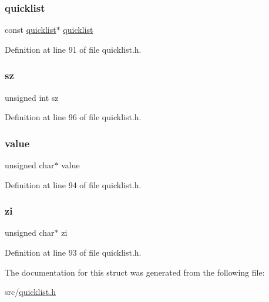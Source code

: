 \mbox{\label{structquicklist_entry_a4aa33c2ba0681808fcf026725cfac512}} 
\subsubsection{\texorpdfstring{quicklist}{quicklist}}
{\footnotesize\ttfamily const \hyperlink{structquicklist}{quicklist}$\ast$ \hyperlink{structquicklist}{quicklist}}



Definition at line 91 of file quicklist.\+h.

\mbox{\label{structquicklist_entry_a2c1bd10d4bbc82d2d6c052c5842c0c8c}} 
\subsubsection{\texorpdfstring{sz}{sz}}
{\footnotesize\ttfamily unsigned int sz}



Definition at line 96 of file quicklist.\+h.

\mbox{\label{structquicklist_entry_a2f3bdb9d405cf00d02949b9141ce1396}} 
\subsubsection{\texorpdfstring{value}{value}}
{\footnotesize\ttfamily unsigned char$\ast$ value}



Definition at line 94 of file quicklist.\+h.

\mbox{\label{structquicklist_entry_a14218c4c1ee05ec32cc12721f772f294}} 
\subsubsection{\texorpdfstring{zi}{zi}}
{\footnotesize\ttfamily unsigned char$\ast$ zi}



Definition at line 93 of file quicklist.\+h.



The documentation for this struct was generated from the following file\+:\begin{DoxyCompactItemize}
\item 
src/\hyperlink{quicklist_8h}{quicklist.\+h}\end{DoxyCompactItemize}
